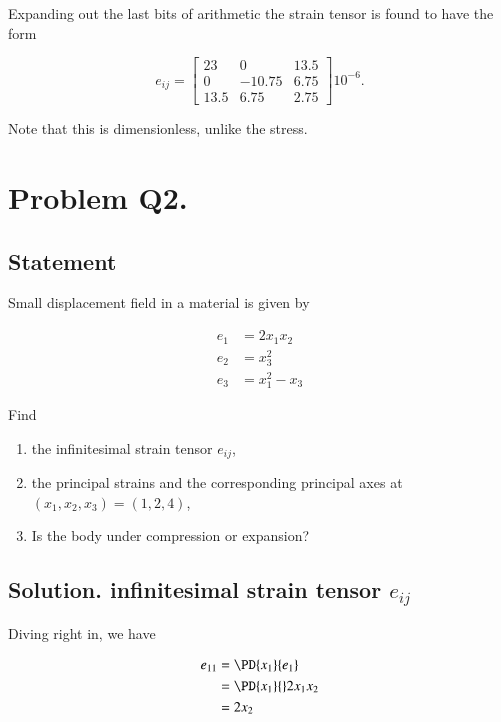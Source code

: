 Expanding out the last bits of arithmetic the strain tensor is found to have the form

\begin{equation}\label{eqn:continuumProblemSet1:230}
e_{ij}
=
\begin{bmatrix}
 23 & 0 & 13.5 \\
 0 & -10.75 & 6.75 \\
 13.5 & 6.75 & 2.75
\end{bmatrix}
 10^{-6}.
\end{equation}

Note that this is dimensionless, unlike the stress.

\section{Problem Q2.}
\subsection{Statement}

Small displacement field in a material is given by

\begin{align}\label{eqn:continuumProblemSet1:30}
e_1 &= 2 x_1 x_2 \\
e_2 &= x_3^2 \\
e_3 &= x_1^2 - x_3
\end{align}

Find

\begin{enumerate}
\item the infinitesimal strain tensor $e_{ij}$,
\item the principal strains and the corresponding principal axes at $(x_1, x_2, x_3) = (1, 2, 4)$,
\item Is the body under compression or expansion?
\end{enumerate}

\subsection{Solution.  infinitesimal strain tensor $e_{ij}$}

Diving right in, we have

\begin{align*}
e_{11}
&= \PD{x_1}{e_1} \\
&= \PD{x_1}{}2 x_1 x_2 \\
&= 2 x_2
\end{align*}

